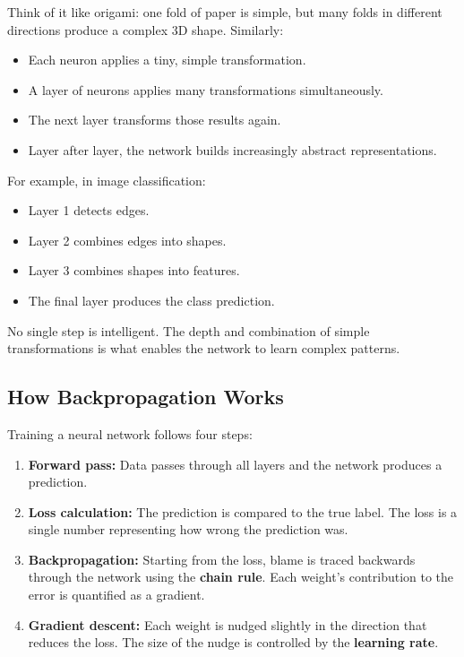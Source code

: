Think of it like origami: one fold of paper is simple, but many folds in different
directions produce a complex 3D shape. Similarly:

\begin{itemize}
    \item Each neuron applies a tiny, simple transformation.
    \item A layer of neurons applies many transformations simultaneously.
    \item The next layer transforms those results again.
    \item Layer after layer, the network builds increasingly abstract representations.
\end{itemize}

For example, in image classification:
\begin{itemize}
    \item Layer 1 detects edges.
    \item Layer 2 combines edges into shapes.
    \item Layer 3 combines shapes into features.
    \item The final layer produces the class prediction.
\end{itemize}

No single step is intelligent. The depth and combination of simple transformations is
what enables the network to learn complex patterns.

\subsection{How Backpropagation Works}

Training a neural network follows four steps:

\begin{enumerate}
    \item \textbf{Forward pass:} Data passes through all layers and the network produces
          a prediction.
    \item \textbf{Loss calculation:} The prediction is compared to the true label. The
          loss is a single number representing how wrong the prediction was.
    \item \textbf{Backpropagation:} Starting from the loss, blame is traced backwards
          through the network using the \textbf{chain rule}. Each weight's contribution
          to the error is quantified as a gradient.
    \item \textbf{Gradient descent:} Each weight is nudged slightly in the direction that
          reduces the loss. The size of the nudge is controlled by the \textbf{learning
          rate}.
\end{enumerate}

